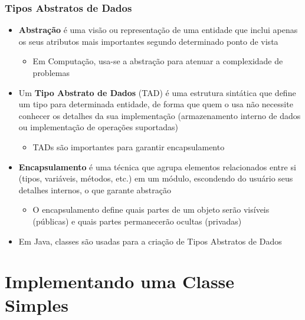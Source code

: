 \documentclass[xcolor={dvipsnames,table},aspectratio=169]{beamer}
\begin{document}
\begin{frame}\frametitle{Tipos Abstratos de Dados}
\begin{itemize}
	\item \textbf{Abstração} é uma visão ou representação de uma entidade que inclui apenas os seus atributos mais importantes segundo determinado ponto de vista
	\begin{itemize}
		\item Em Computação, usa-se a abstração para atenuar a complexidade de problemas
	\end{itemize}
	\item Um \textbf{Tipo Abstrato de Dados} (TAD) é uma estrutura sintática que define um tipo para determinada entidade, de forma que quem o usa não necessite conhecer os detalhes da sua implementação (armazenamento interno de dados ou implementação de operações suportadas)
	\begin{itemize}
		\item TADs são importantes para garantir encapsulamento
	\end{itemize}
	\item \textbf{Encapsulamento} é uma técnica que agrupa elementos relacionados entre si (tipos, variáveis, métodos, etc.) em um módulo, escondendo do usuário seus detalhes internos, o que garante abstração
	\begin{itemize}
		\item O encapsulamento define quais partes de um objeto serão visíveis (públicas) e quais partes permanecerão ocultas (privadas)
	\end{itemize}
	\item Em Java, classes são usadas para a criação de Tipos Abstratos de Dados
\end{itemize}
\end{frame}

\section{Implementando uma Classe Simples}
\end{document}
